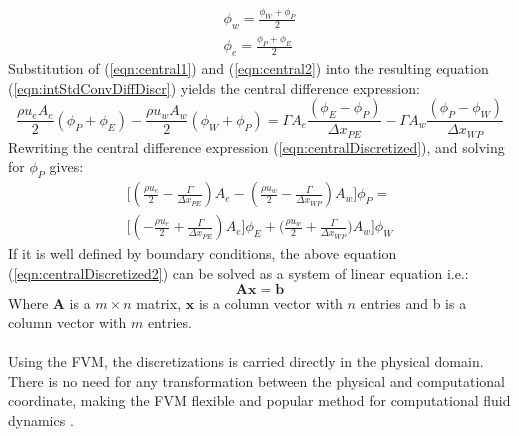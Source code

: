 \documentclass[a4paper, 12pt]{report}
\begin{document}
\begin{eqnarray}
\label{eqn:central1}
\phi_w = \frac{\phi_W + \phi_P}{2} \\ 
\label{eqn:central2}
\phi_e = \frac{\phi_P + \phi_E}{2} 
\end{eqnarray}
Substitution of (\ref{eqn:central1}) and (\ref{eqn:central2}) into the resulting equation (\ref{eqn:intStdConvDiffDiscr}) yields the central difference expression:
\begin{equation}
\frac{\rho u_e A_e}{2} (\phi_P + \phi_E) - \frac{\rho u_w A_w}{2} (\phi_W + \phi_P) = \Gamma A_e \frac{(\phi_E - \phi_P)}{\Delta x_{PE}} - \Gamma A_w \frac{(\phi_P - \phi_W)}{\Delta x_{WP}}
\label{eqn:centralDiscretized}
\end{equation}
Rewriting the central difference expression (\ref{eqn:centralDiscretized}), and solving for  $\phi_P$ gives:
\begin{eqnarray}
\Big[(\frac{\rho u_e}{2} - \frac{\Gamma}{\Delta x_{PE}} )A_e  - (\frac{\rho u_w}{2} - \frac{\Gamma}{\Delta x_{WP}} )A_w \Big]\phi_P = \nonumber \\ 
\Big[(- \frac{\rho u_e}{2} + \frac{\Gamma}{\Delta x_{PE}})A_e\Big]\phi_E + \Big(\frac{\rho u_w}{2} + \frac{\Gamma}{\Delta x_{WP}} )A_w \Big]\phi_W
\label{eqn:centralDiscretized2}
\end{eqnarray}
If it is well defined by boundary conditions, the above equation (\ref{eqn:centralDiscretized2}) can be solved as a system of linear equation i.e.:
\begin{equation}
\mathbf{A}\mathbf{x}=\mathbf{b}
\label{eqn:sysOfLinearEqn}
\end{equation}
Where $\mathbf{A}$ is a $m \times n$ matrix, $\mathbf{x}$ is a column vector with $n$ entries and b is a column vector with $m$ entries.\\
\\
Using the FVM, the discretizations is carried directly in the physical domain. There is no need for any transformation between the physical and computational coordinate, making the FVM flexible and popular method for computational fluid dynamics \cite{CFDOpenFOAM}.
\end{document}
